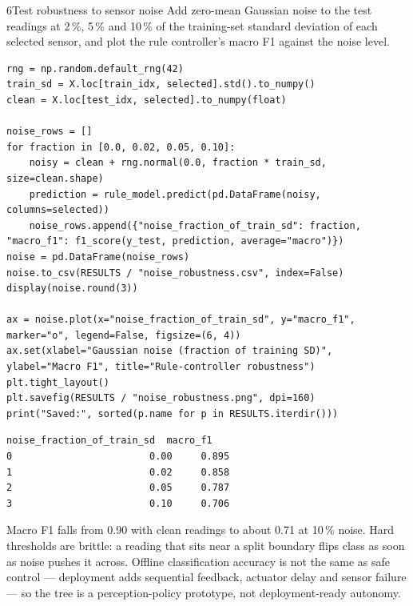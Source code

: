 \begin{labquestion}{6}{Test robustness to sensor noise}
Add zero-mean Gaussian noise to the test readings at 2\,\%, 5\,\% and 10\,\% of the training-set standard deviation of each selected sensor, and plot the rule controller's macro F1 against the noise level.
\end{labquestion}

\begin{labanswer}
\begin{lstlisting}[style=utppython]
rng = np.random.default_rng(42)
train_sd = X.loc[train_idx, selected].std().to_numpy()
clean = X.loc[test_idx, selected].to_numpy(float)

noise_rows = []
for fraction in [0.0, 0.02, 0.05, 0.10]:
    noisy = clean + rng.normal(0.0, fraction * train_sd, size=clean.shape)
    prediction = rule_model.predict(pd.DataFrame(noisy, columns=selected))
    noise_rows.append({"noise_fraction_of_train_sd": fraction, "macro_f1": f1_score(y_test, prediction, average="macro")})
noise = pd.DataFrame(noise_rows)
noise.to_csv(RESULTS / "noise_robustness.csv", index=False)
display(noise.round(3))

ax = noise.plot(x="noise_fraction_of_train_sd", y="macro_f1", marker="o", legend=False, figsize=(6, 4))
ax.set(xlabel="Gaussian noise (fraction of training SD)", ylabel="Macro F1", title="Rule-controller robustness")
plt.tight_layout()
plt.savefig(RESULTS / "noise_robustness.png", dpi=160)
print("Saved:", sorted(p.name for p in RESULTS.iterdir()))
\end{lstlisting}
\expectedoutput
\begin{lstlisting}[style=utpterminal]
   noise_fraction_of_train_sd  macro_f1
0                        0.00     0.895
1                        0.02     0.858
2                        0.05     0.787
3                        0.10     0.706
\end{lstlisting}
Macro F1 falls from 0.90 with clean readings to about 0.71 at 10\,\% noise. Hard thresholds are brittle: a reading that sits near a split boundary flips class as soon as noise pushes it across. Offline classification accuracy is not the same as safe control --- deployment adds sequential feedback, actuator delay and sensor failure --- so the tree is a perception-policy prototype, not deployment-ready autonomy.
\end{labanswer}


